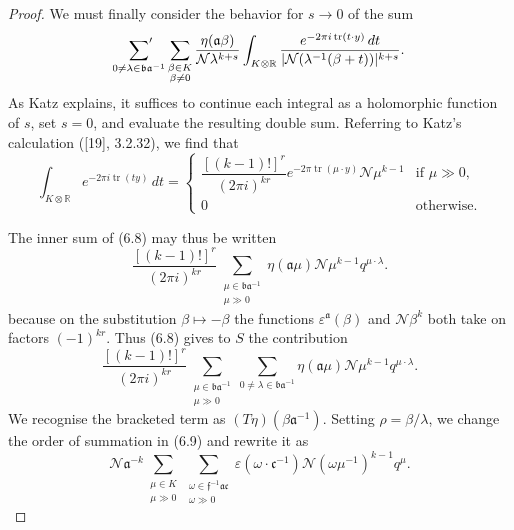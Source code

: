 \documentclass[12pt,a4paper]{article}
\theoremstyle{plain}
\theoremstyle{definition}
\theoremstyle{remark}
\DeclareMathOperator{\tr}{tr}
\begin{document}
\begin{proof}
We must finally consider the behavior for $s \to 0$ of the sum
\begin{equation}\label{eq:6.8}
\sideset{}{'}\sum_{0 \neq \lambda \in \mathfrak{b}\mathfrak{a}^{-1}} \sum_{\substack{\beta \in K \\ \beta \neq 0}} \frac{\eta(\mathfrak{a}\beta)}{\mathcal{N}\lambda^{k+s}} \int_{K \otimes \mathbb{R}} \frac{e^{-2\pi i \tr(t \cdot y)}\, dt}{|\mathcal{N}(\lambda^{-1}(\beta + t))|^{k+s}}.
\end{equation}
As Katz explains, it suffices to continue each integral as a holomorphic function of $s$, set $s=0$, and evaluate the resulting double sum. Referring to Katz's calculation ([19], 3.2.32), we find that
\[
\int_{K \otimes \mathbb{R}} e^{-2\pi i \tr(ty)}\, dt = \begin{cases}
\dfrac{[(k-1)!]^r}{(2\pi i)^{kr}} e^{-2\pi \tr(\mu \cdot y)} \mathcal{N}\mu^{k-1} & \text{if } \mu \gg 0, \\
0 & \text{otherwise}.
\end{cases}
\]

The inner sum of (6.8) may thus be written
\[
\frac{[(k-1)!]^r}{(2\pi i)^{kr}} \sum_{\substack{\mu \in \mathfrak{b}\mathfrak{a}^{-1} \\ \mu \gg 0}} \eta(\mathfrak{a}\mu) \mathcal{N}\mu^{k-1} q^{\mu \cdot \lambda}.
\]
because on the substitution $\beta \mapsto -\beta$ the functions $\varepsilon^{\mathfrak{a}}(\beta)$ and $\mathcal{N}\beta^k$ both take on factors $(-1)^{kr}$. Thus (6.8) gives to $S$ the contribution
\begin{equation}\label{eq:6.9}
\frac{[(k-1)!]^r}{(2\pi i)^{kr}} \sum_{\substack{\mu \in \mathfrak{b}\mathfrak{a}^{-1} \\ \mu \gg 0}} \sum_{0 \neq \lambda \in \mathfrak{b}\mathfrak{a}^{-1}} \eta(\mathfrak{a}\mu) \mathcal{N}\mu^{k-1} q^{\mu \cdot \lambda}.
\end{equation}
We recognise the bracketed term as $(T\eta)(\beta \mathfrak{a}^{-1})$. Setting $\rho = \beta/\lambda$, we change the order of summation in (6.9) and rewrite it as
\[
\mathcal{N}\mathfrak{a}^{-k} \sum_{\substack{\mu \in K \\ \mu \gg 0}} \sum_{\substack{\omega \in \mathfrak{f}^{-1}\mathfrak{a}\mathfrak{c} \\ \omega \gg 0}} \varepsilon(\omega \cdot \mathfrak{c}^{-1}) \mathcal{N}(\omega\mu^{-1})^{k-1} q^\mu.
\]


\end{proof}
\end{document}
